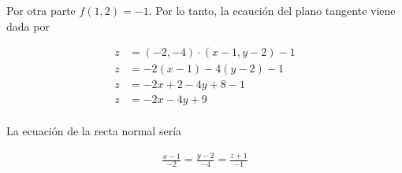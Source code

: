 \documentclass{article}
\theoremstyle{plain}
\theoremstyle{definition}
\begin{document}
Por otra parte $f(1,2) = -1$.  Por lo tanto, la ecaución del plano tangente viene dada por

\begin{align*}
     z &=  (-2,-4) \cdot (x-1,y-2) -1 \\
     z &=  -2(x-1)-4(y-2) -1 \\
     z &=  -2x+2-4y+8-1\\
     z &= -2x-4y+9\\
\end{align*}

La ecuación de la recta normal sería

\begin{align*}
\frac{x-1}{-2} = \frac{y-2}{-4} =\frac{z+1}{-1}
\end{align*}
\end{document}

